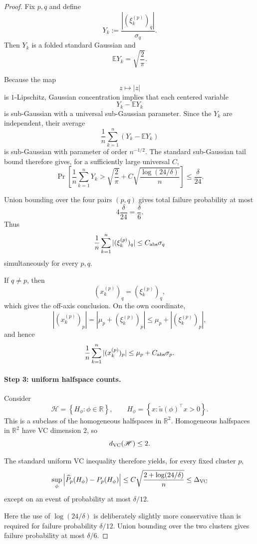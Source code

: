 \documentclass{article} %
\theoremstyle{plain}
\theoremstyle{definition}
\theoremstyle{remark}
\begin{document}
\begin{proof}
Fix $p,q$ and define
\[
Y_k
:=
\frac{|(\xi_k^{(p)})_q|}{\sigma_q}.
\]
Then $Y_k$ is a folded standard Gaussian and
\[
\mathbb EY_k
=
\sqrt{\frac2\pi}.
\]

Because the map
\[
z\mapsto |z|
\]
is $1$-Lipschitz, Gaussian concentration implies that each centered
variable
\[
Y_k-\mathbb EY_k
\]
is sub-Gaussian with a universal sub-Gaussian parameter. Since the
$Y_k$ are independent, their average
\[
\frac1n
\sum_{k=1}^n
\left(
Y_k-\mathbb EY_k
\right)
\]
is sub-Gaussian with parameter of order $n^{-1/2}$.
The standard sub-Gaussian tail bound therefore gives, for a sufficiently
large universal $C$,
\[
\Pr\!\left[
\frac1n\sum_{k=1}^nY_k
>
\sqrt{\frac2\pi}
+
C
\sqrt{
\frac{\log(24/\delta)}{n}
}
\right]
\le
\frac{\delta}{24}.
\]

Union bounding over the four pairs $(p,q)$ gives total failure
probability at most
\[
4\frac{\delta}{24}
=
\frac{\delta}{6}.
\]
Thus
\[
\frac1n
\sum_{k=1}^n
|(\xi_k^{(p)})_q|
\le
C_{\rm abs}\sigma_q
\]
simultaneously for every $p,q$.

If $q\neq p$, then
\[
(x_k^{(p)})_q
=
(\xi_k^{(p)})_q,
\]
which gives the off-axis conclusion. On the own coordinate,
\[
|(x_k^{(p)})_p|
=
|\mu_p+(\xi_k^{(p)})_p|
\le
\mu_p+|(\xi_k^{(p)})_p|,
\]
and hence
\[
\frac1n
\sum_{k=1}^n
|(x_k^{(p)})_p|
\le
\mu_p+C_{\rm abs}\sigma_p.
\]

\paragraph{Step 3: uniform halfspace counts.}

Consider
\[
\mathscr H
=
\left\{
H_\phi:
\phi\in\mathbb R
\right\},
\qquad
H_\phi
=
\left\{
x:
\widetilde u(\phi)^\top x>0
\right\}.
\]
This is a subclass of the homogeneous halfspaces in $\mathbb R^2$.
Homogeneous halfspaces in $\mathbb R^2$ have VC dimension $2$, so
\[
d_{\rm VC}(\mathscr H)\le2.
\]

The standard uniform VC inequality therefore yields, for every fixed
cluster $p$,
\[
\sup_{\phi}
\left|
\widehat P_p(H_\phi)-P_p(H_\phi)
\right|
\le
C
\sqrt{
\frac{
2+\log(24/\delta)
}{n}
}
\le
\Delta_{\rm VC}
\]
except on an event of probability at most $\delta/12$.

Here the use of $\log(24/\delta)$ is deliberately slightly more
conservative than is required for failure probability $\delta/12$.
Union bounding over the two clusters gives failure probability at most
$\delta/6$.


\end{proof}
\end{document}
